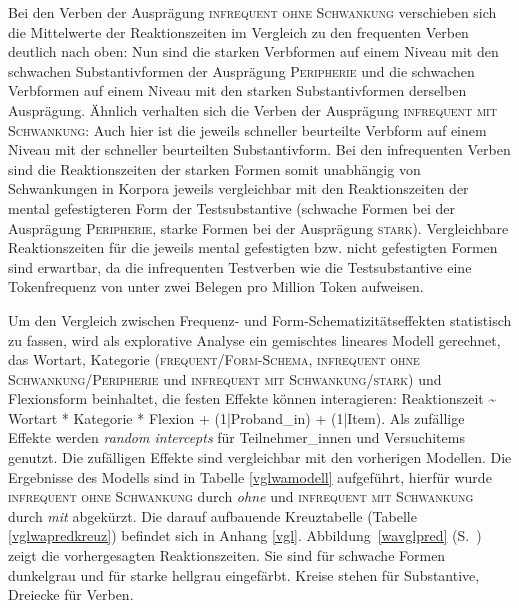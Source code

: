 Bei den Verben der Ausprägung \textsc{infrequent ohne Schwankung} verschieben sich die Mittelwerte der Reaktionszeiten im Vergleich zu den frequenten Verben deutlich nach oben: Nun sind die starken Verbformen auf einem Niveau mit den schwachen Substantivformen der Ausprägung \textsc{Peripherie} und die schwachen Verbformen auf einem Niveau mit den starken Substantivformen derselben Ausprägung. Ähnlich verhalten sich die Verben der Ausprägung \textsc{infrequent mit Schwankung}: Auch hier ist die jeweils schneller beurteilte Verbform auf einem Niveau mit der schneller beurteilten Substantivform. Bei den infrequenten Verben sind die Reaktionszeiten der starken Formen somit unabhängig von Schwankungen in Korpora jeweils vergleichbar mit den Reaktionszeiten der mental gefestigteren Form der Testsubstantive (schwache Formen bei der Ausprägung \textsc{Peripherie}, starke Formen bei der Ausprägung \textsc{stark}). Vergleichbare Reaktionszeiten für die jeweils mental gefestigten bzw. nicht gefestigten Formen sind erwartbar, da die infrequenten Testverben wie die Testsubstantive eine Tokenfrequenz von unter zwei Belegen pro Million Token aufweisen.

Um den Vergleich zwischen Frequenz- und Form-Schematizitätseffekten statistisch zu fassen, wird als explorative Analyse ein gemischtes lineares Modell gerechnet, das Wortart, Kategorie (\textsc{\textsc{frequent/Form-Schema}}, \textsc{infrequent ohne Schwankung/Peri\-phe\-rie} und \textsc{infrequent mit Schwankung/stark}) und Flexionsform beinhaltet, die festen Effekte können interagieren: Reaktionszeit \~{} Wortart * Kategorie * Flexion + (1|Proband\_in) + (1|Item). Als zufällige Effekte werden \textit{random intercepts} für Teilnehmer\_innen und Versuch\-items genutzt. Die zufälligen Effekte sind vergleichbar mit den vorherigen Modellen. Die Ergebnisse des Modells sind in Tabelle \ref{vglwamodell} aufgeführt, hierfür wurde \textsc{infrequent ohne Schwankung} durch \textit{ohne} und \textsc{infrequent mit Schwankung} durch \textit{mit} abgekürzt. Die darauf aufbauende Kreuztabelle (Tabelle \ref{vglwapredkreuz}) befindet sich in Anhang \ref{vgl}. Abbildung~\ref{wavglpred} (S.~\pageref{wavglpred}) zeigt die vorhergesagten Reaktionszeiten. Sie sind für schwache Formen dunkelgrau und für starke hellgrau eingefärbt. Kreise stehen für Substantive, Dreiecke für Verben. 

